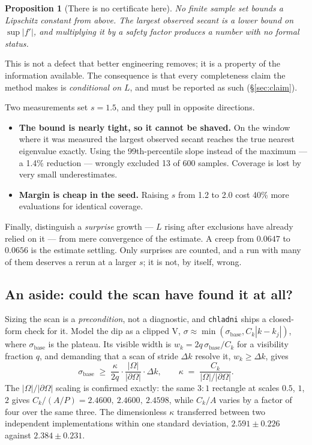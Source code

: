 \documentclass[11pt]{article}
\newtheorem{proposition}{Proposition}
\theoremstyle{definition}
\theoremstyle{remark}
\newcommand{\code}[1]{\texttt{#1}}
\newcommand{\Om}{\Omega}
\newcommand{\sig}{\sigma}
\newcommand{\abs}[1]{\left\lvert #1 \right\rvert}
\begin{document}
\begin{proposition}[There is no certificate here]
\label{prop:nolipschitz}
No finite sample set bounds a Lipschitz constant from above. The largest observed secant is a
\emph{lower} bound on $\sup\abs{f'}$, and multiplying it by a safety factor produces a number
with no formal status.
\end{proposition}

This is not a defect that better engineering removes; it is a property of the information
available. The consequence is that every completeness claim the method makes is
\emph{conditional on $L$}, and must be reported as such (\S\ref{sec:claim}).

Two measurements set $s=1.5$, and they pull in opposite directions.

\begin{itemize}
\item \textbf{The bound is nearly tight, so it cannot be shaved.} On the window where it was
measured the largest observed secant reaches the true nearest eigenvalue exactly. Using the
99th-percentile slope instead of the maximum --- a 1.4\% reduction --- wrongly excluded 13 of
600 samples. Coverage is lost by very small underestimates.
\item \textbf{Margin is cheap in the seed.} Raising $s$ from 1.2 to 2.0 cost 40\% more
evaluations for identical coverage.
\end{itemize}

Finally, distinguish a \emph{surprise} growth --- $L$ rising after exclusions have already
relied on it --- from mere convergence of the estimate. A creep from $0.0647$ to $0.0656$ is
the estimate settling. Only surprises are counted, and a run with many of them deserves a rerun
at a larger $s$; it is not, by itself, wrong.

\subsection{An aside: could the scan have found it at all?}

Sizing the scan is a \emph{precondition}, not a diagnostic, and \code{chladni} ships a
closed-form check for it. Model the dip as a clipped V, $\sig\approx\min(\sig_{\text{base}},
C_k\abs{k-k_j})$, where $\sig_{\text{base}}$ is the plateau. Its visible width is
$w_k = 2q\,\sig_{\text{base}}/C_k$ for a visibility fraction $q$, and demanding that a scan of
stride $\Delta k$ resolve it, $w_k\ge\Delta k$, gives
\begin{equation}\label{eq:findability}
  \sig_{\text{base}} \;\ge\; \frac{\kappa}{2q}\cdot\frac{\abs{\Om}}{\abs{\partial\Om}}\cdot\Delta k,
  \qquad \kappa \;=\; \frac{C_k}{\abs{\Om}/\abs{\partial\Om}} .
\end{equation}
The $\abs{\Om}/\abs{\partial\Om}$ scaling is confirmed exactly: the same $3\!:\!1$ rectangle at
scales $0.5$, $1$, $2$ gives $C_k/(A/P) = 2.4600,\ 2.4600,\ 2.4598$, while $C_k/A$ varies by a
factor of four over the same three. The dimensionless $\kappa$ transferred between two
independent implementations within one standard deviation, $2.591\pm0.226$ against
$2.384\pm0.231$.
\end{document}
